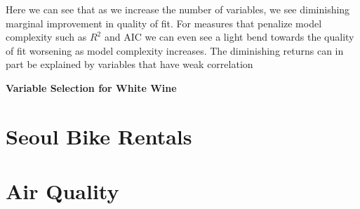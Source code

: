 \documentclass{article}
\begin{document}
	Here we can see that as we increase the number of variables, we see diminishing marginal improvement in quality of 
	fit. For measures that penalize model complexity such as $R^2$ and AIC we can even see a light bend towards 
	the quality of fit worsening as model complexity increases. The diminishing returns can in part be explained by 
	variables that have weak correlation 
	
	
	\textbf{Variable Selection for White Wine}
	
	\section{Seoul Bike Rentals}
	\section{Air Quality}
	
	
\end{document}
